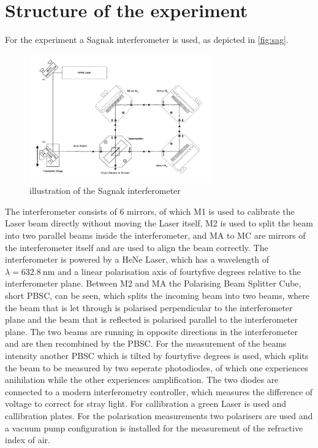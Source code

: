 \section{Structure of the experiment}
\label{sec:struc}
For the experiment a Sagnak interferometer is used, as depicted in \autoref{fig:sag}.
\begin{figure}[H]
    \centering
    \includegraphics[width=0.7\textwidth]{sagnak.pdf}
    \caption{illustration of the Sagnak interferometer \cite{sample}}
    \label{fig:sag}
\end{figure}
\noindent
The interferometer consists of 6 mirrors, of which M1 is used to calibrate the Laser beam directly without moving the Laser itself, M2 is used to split the beam into two parallel beams inside the interferometer, and MA to MC are mirrors of the interferometer itself and are used to align the beam correctly.
The interferometer is powered by a HeNe Laser, which has a wavelength of $\lambda = \SI{632.8}{\nano\meter}$ and a linear polarisation axis of fourtyfive degrees relative to the interferometer plane. Between M2 and MA the Polarising Beam Splitter Cube, short PBSC, can be seen, which splits the incoming beam into two beams, where the beam that is let through is polarised perpendicular to the interferometer plane and the beam that is reflected is polarised parallel to the interferometer plane. The two beams are running in opposite directions in the interferometer and are then recombined by the PBSC.
For the measurement of the beams intensity another PBSC which is tilted by fourtyfive degrees is used, which splits the beam to be measured by two seperate photodiodes, of which one experiences anihilation while the other experiences amplification. The two diodes are connected to a modern interferometry controller, which measures the difference of voltage to correct for stray light. For callibration a green Laser is used and callibration plates. For the polarisation measurements two polarisers are used and a vacuum pump configuration is installed for the measurement of the refractive index of air. 

